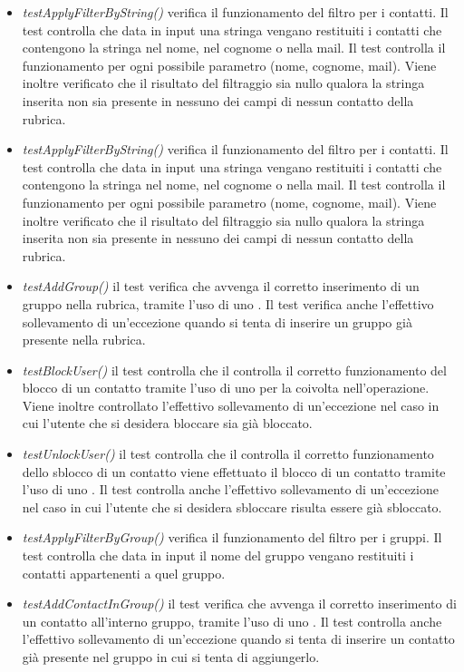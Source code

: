 \begin{itemize}
\item \textit{testApplyFilterByString() } verifica il funzionamento del filtro per i contatti. Il test controlla che data in input una stringa vengano restituiti i contatti che contengono la stringa nel nome, nel cognome o nella mail. Il test controlla il funzionamento per ogni possibile parametro (nome, cognome, mail). Viene inoltre verificato che il risultato del filtraggio sia nullo qualora la stringa inserita non sia presente in nessuno dei campi di nessun contatto della rubrica.
\item \textit{testApplyFilterByString()} verifica il funzionamento del filtro per i contatti. Il test controlla che data in input una stringa vengano restituiti i contatti che contengono la stringa nel nome, nel cognome o nella mail. Il test controlla il funzionamento per ogni possibile parametro (nome, cognome, mail). Viene inoltre verificato che il risultato del filtraggio sia nullo qualora la stringa inserita non sia presente in nessuno dei campi di nessun contatto della rubrica.
\item \textit{testAddGroup()} il test verifica che avvenga il corretto inserimento di un gruppo nella rubrica, tramite l'uso di uno . Il test verifica anche l'effettivo sollevamento di un'eccezione quando si tenta di inserire un gruppo già presente nella rubrica.
\item \textit{testBlockUser()} il test controlla che il controlla il corretto funzionamento del blocco di un contatto tramite l'uso di uno  per la  coivolta nell'operazione. Viene inoltre controllato l'effettivo sollevamento di un'eccezione nel caso in cui l'utente che si desidera bloccare sia già bloccato.
\item \textit{testUnlockUser()} il test controlla che il controlla il corretto funzionamento dello sblocco di un contatto viene effettuato il blocco di un contatto tramite l'uso di uno . Il test controlla anche l'effettivo sollevamento di un'eccezione nel caso in cui l'utente che si desidera sbloccare risulta essere già sbloccato.
\item \textit{testApplyFilterByGroup() } verifica il funzionamento del filtro per i gruppi. Il test controlla che data in input il nome del gruppo vengano restituiti i contatti appartenenti a quel gruppo. 
\item \textit{testAddContactInGroup()} il test verifica che avvenga il corretto inserimento di un contatto all'interno gruppo, tramite l'uso di uno . Il test controlla anche l'effettivo sollevamento di un'eccezione quando si tenta di inserire un contatto già presente nel gruppo in cui si tenta di aggiungerlo.

\end{itemize}
